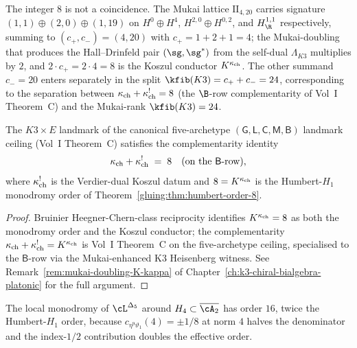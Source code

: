 \begin{remark}
\label{gluing:rem:eight-from-signature}
The integer $8$ is not a coincidence. The Mukai lattice
$\mathrm{II}_{4, 20}$ carries signature $(1, 1) \oplus (2, 0) \oplus
(1, 19)$ on $H^0 \oplus H^4$, $H^{2,0} \oplus H^{0, 2}$, and
$H^{1, 1}_{\R}$ respectively, summing to $(c_+, c_-) = (4, 20)$ with
$c_+ = 1 + 2 + 1 = 4$; the Mukai-doubling that produces the
Hall--Drinfeld pair $(\sg, \sg^*)$ from the self-dual
$\Lambda_{K3}$ multiplies by $2$, and $2 \cdot c_+ = 2 \cdot 4 = 8$
is the Koszul conductor $K^{\kappa_{\mathrm{ch}}}$. The other summand $c_- = 20$
enters separately in the split $\kfib(K3) = c_+ + c_- = 24$,
corresponding to the separation between $\kappa_{\mathrm{ch}} + \kappa_{\mathrm{ch}}^! = 8$ (the
$\B$-row complementarity of Vol~I Theorem~C) and the Mukai-rank
$\kfib(K3) = 24$.
\end{remark}

\begin{theorem}
\label{gluing:thm:B-row-complementarity}
The $K3 \times E$ landmark of the canonical five-archetype
$(\mathsf G, \mathsf L, \mathsf C, \mathsf M, \mathsf B)$ landmark
ceiling (Vol~I Theorem~C) satisfies
the complementarity identity
\[
 \kappa_{\mathrm{ch}} + \kappa_{\mathrm{ch}}^{!} \;=\; 8 \quad\text{(on the}\ \mathsf B\text{-row)},
\]
where $\kappa_{\mathrm{ch}}^{!}$ is the Verdier-dual Koszul datum and $8 = K^{\kappa_{\mathrm{ch}}}$
is the Humbert-$H_1$ monodromy order of
Theorem~\ref{gluing:thm:humbert-order-8}.
\end{theorem}

\begin{proof}
Bruinier Heegner-Chern-class reciprocity identifies $K^{\kappa_{\mathrm{ch}}} = 8$ as
both the monodromy order and the Koszul conductor; the
complementarity $\kappa_{\mathrm{ch}} + \kappa_{\mathrm{ch}}^! = K^{\kappa_{\mathrm{ch}}}$ is Vol~I Theorem~C on the
five-archetype ceiling, specialised to the $\mathsf B$-row via the
Mukai-enhanced K3 Heisenberg witness. See
Remark~\ref{rem:mukai-doubling-K-kappa} of
Chapter~\ref{ch:k3-chiral-bialgebra-platonic} for the full argument.
\end{proof}

\begin{corollary}
\label{gluing:cor:H4-order-16}
The local monodromy of $\cL^{\Delta_5}$ around $H_4 \subset
\overline{\cA_2}$ has order $16$, twice the Humbert-$H_1$ order,
because $c_{\eta^9 \vartheta_1}(4) = \pm 1/8$ at norm $4$ halves the
denominator and the index-$1/2$ contribution doubles the effective
order.
\end{corollary}

